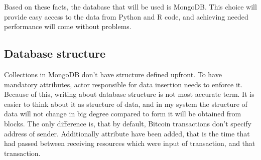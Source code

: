 \documentclass[12pt, en, eng, oneside]{mgr}
\begin{document}
Based on these facts, the database that will be used is MongoDB. This choice will provide easy access to the data from Python and R code, and achieving needed performance will come without problems.


\subsection{Database structure}
 
Collections in MongoDB don't have structure defined upfront. To have mandatory attributes, actor responsible for data insertion needs to enforce it. Because of this, writing about database structure is not most accurate term. It is easier to think about it as structure of data, and in my system the structure of data will not change in big degree compared to form it will be obtained from blocks. The only difference is, that by default, Bitcoin transactions don't specify address of sender. Additionally attribute have been added, that is the time that had passed between receiving resources which were input of transaction, and that transaction.
\end{document}

